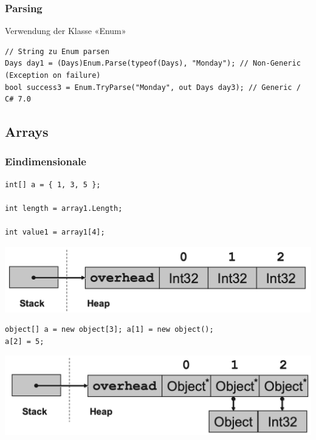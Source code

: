\subsubsection{Parsing}
Verwendung der Klasse «Enum»
\begin{lstlisting}
// String zu Enum parsen
Days day1 = (Days)Enum.Parse(typeof(Days), "Monday"); // Non-Generic (Exception on failure)
bool success3 = Enum.TryParse("Monday", out Days day3); // Generic / C# 7.0
\end{lstlisting}


\subsection{Arrays}
\subsubsection{Eindimensionale}
\begin{lstlisting}
int[] a = { 1, 3, 5 };

int length = array1.Length;

int value1 = array1[4];
\end{lstlisting}
\begin{center}
    \includegraphics[scale=.23]{graphic/cGrundlagen/CGrundlagen_1Array_ValueTypes.png}
\end{center}
\vspace{-8pt}

\begin{lstlisting}
object[] a = new object[3]; a[1] = new object();
a[2] = 5;
\end{lstlisting}
\begin{center}
    \includegraphics[scale=.23]{graphic/cGrundlagen/CGrundlagen_1Array_ReferenceTypes.png}
\end{center}
\vspace{-8pt}

